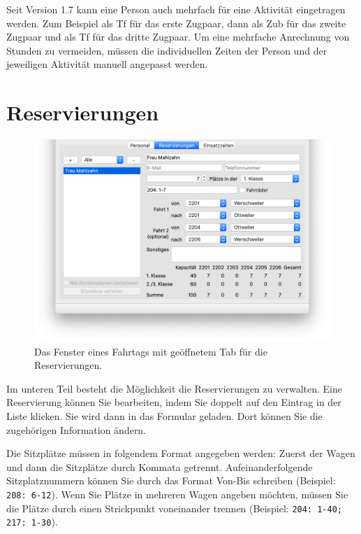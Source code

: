 \begin{neu}
\begin{hinweis}
  Seit Version 1.7 kann eine Person auch mehrfach für eine Aktivität eingetragen werden.
  Zum Beispiel als Tf für das erste Zugpaar,
  dann als Zub für das zweite Zugpaar und als Tf für das dritte Zugpaar.
  Um eine mehrfache Anrechnung von Stunden zu vermeiden,
  müssen die individuellen Zeiten der Person und der jeweiligen Aktivität manuell angepasst werden.
\end{hinweis}
\end{neu}



\section{Reservierungen}
\begin{figure}[!h]
	\includegraphics[width=\textwidth]{img/fahrtag_reservierungen}
	\caption{Das Fenster eines Fahrtags mit geöffnetem Tab für die Reservierungen.}
	\label{fig:einsatz:fahrtag:reservierungen}
\end{figure}
Im unteren Teil besteht die Möglichkeit die Reservierungen zu verwalten.
Eine Reservierung können Sie bearbeiten, indem Sie doppelt auf den Eintrag in der Liste klicken.
Sie wird dann in das Formular geladen. Dort können Sie die zugehörigen Information ändern.


Die Sitzplätze müssen in folgendem Format angegeben werden:
Zuerst der Wagen und dann die Sitzplätze durch Kommata getrennt.
Aufeinanderfolgende Sitzplatznummern können Sie durch das Format Von-Bis schreiben (Beispiel: \texttt{208: 6-12}).
Wenn Sie Plätze in mehreren Wagen angeben möchten,
müssen Sie die Plätze durch einen Strickpunkt voneinander trennen
(Beispiel: \texttt{204: 1-40; 217: 1-30}).


